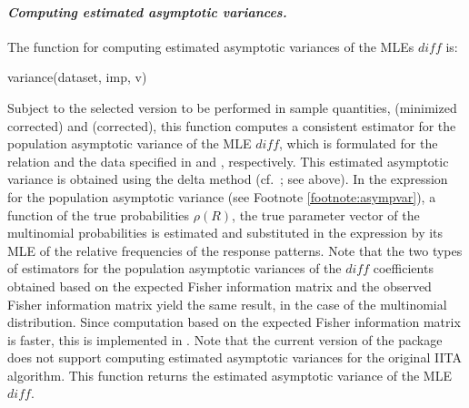 \documentclass[nojss]{jss}
\begin{document}
\paragraph{\it Computing estimated asymptotic variances.}
The function for computing estimated asymptotic variances of the MLEs $\mathit{diff}$ 
\citep[Section \ref{subsec:IITA};][]{US:10} is:
\begin{Code}
variance(dataset, imp, v)
\end{Code}
Subject to the selected version to be performed in sample quantities,  (minimized corrected) and  (corrected),
this function computes a consistent estimator for the population asymptotic variance 
of the MLE $\mathit{diff}$, which is formulated for the relation and the data specified 
in  and , respectively. This estimated asymptotic variance is obtained 
using the delta method (cf.\ ; see above).
In the expression for the population asymptotic variance (see Footnote \ref{footnote:asympvar}), 
a function of the true probabilities $\rho(R)$, the true parameter vector of the multinomial probabilities is estimated 
and substituted in the expression by its MLE of the relative frequencies of the response patterns. 
Note that the two types of estimators for the population asymptotic variances of the 
$\mathit{diff}$ coefficients obtained based on the expected Fisher information matrix 
and the observed Fisher information matrix yield the same result, 
in the case of the multinomial distribution. Since computation based on the expected Fisher 
information matrix is faster, this is implemented in . Note that the current version 
of the package  does not support computing estimated asymptotic variances 
for the original IITA algorithm. This function returns the estimated asymptotic variance 
of the MLE $\mathit{diff}$.
\end{document}
